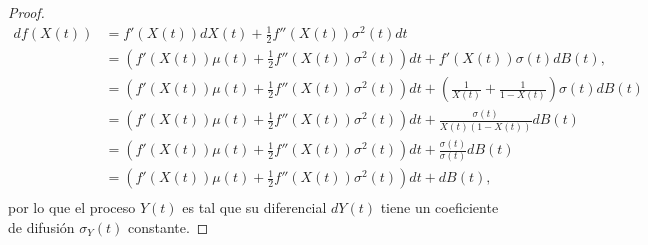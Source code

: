 \documentclass[letterpaper]{article}
\newcommand{\1}{\mathds{1}}
\theoremstyle{definition}
\theoremstyle{definition}
\theoremstyle{definition}
\theoremstyle{definition}
\theoremstyle{definition}
\begin{document}
\begin{enumerate}
\begin{proof}
        \begin{align*}
            df(X(t))&=f'(X(t))dX(t)+\frac{1}{2}f''(X(t))\sigma^2(t)dt\\
            &=\left(f'(X(t))\mu(t)+\frac{1}{2}f''(X(t))\sigma^2(t)\right)dt+f'(X(t))\sigma(t)dB(t),\\
            &=\left(f'(X(t))\mu(t)+\frac{1}{2}f''(X(t))\sigma^2(t)\right)dt+\left(\frac{1}{X(t)}+\frac{1}{1-X(t)}\right)\sigma(t)dB(t)\\
            &=\left(f'(X(t))\mu(t)+\frac{1}{2}f''(X(t))\sigma^2(t)\right)dt+\frac{\sigma(t)}{X(t)(1-X(t))}dB(t)\\
            &=\left(f'(X(t))\mu(t)+\frac{1}{2}f''(X(t))\sigma^2(t)\right)dt+\frac{\sigma(t)}{\sigma(t)}dB(t)\\
            &=\left(f'(X(t))\mu(t)+\frac{1}{2}f''(X(t))\sigma^2(t)\right)dt+dB(t),\\
        \end{align*}
        por lo que el proceso $Y(t)$ es tal que su diferencial $dY(t)$ tiene un coeficiente de difusión $\sigma_Y(t)$ constante.
     \end{proof}


\end{enumerate}
\end{document}
